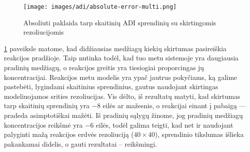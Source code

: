 \newpage

\begin{figure}[h!]
  \centering
  \texttt{[image: images/adi/absolute-error-multi.png]}
  \caption{Absoliuti paklaida tarp skaitinių ADI sprendinių su skirtingomis rezoliucijomis}
  \label{fig:adi-numerical-solution-absolute-error}
\end{figure}

\ref{fig:adi-numerical-solution-absolute-error} paveiksle matome, kad didžiausias medžiagų kiekių skirtumas pasireiškia reakcijos pradžioje. Taip nutinka todėl, kad tuo metu sistemoje yra daugiausia pradinių medžiagų, o reakcijos greitis yra tiesiogiai proporcingas jų koncentracijai. Reakcijos metu modelis yra ypač jautrus pokyčiams, ką galime pastebėti, lygindami skaitinius sprendinius, gautus naudojant skirtingas modeliuojamos srities rezoliucijas. Vis dėlto, iš rezultatų matyti, kad skirtumas tarp skaitinių sprendinių yra $-8$ eilės ar mažesnis, o reakcijai einant į pabaigą — pradeda asimptotiškai mažėti. Iš pradinių sąlygų žinome, jog pradinių medžiagų koncentracijos reikšmė yra $-6$ eilės, todėl galima teigti, kad net ir naudojant palyginti mažą reakcijos erdvės rezoliuciją ($40\times40$), sprendinio tikslumas išlieka pakankamai didelis, o gauti rezultatai -- reikšmingi.
